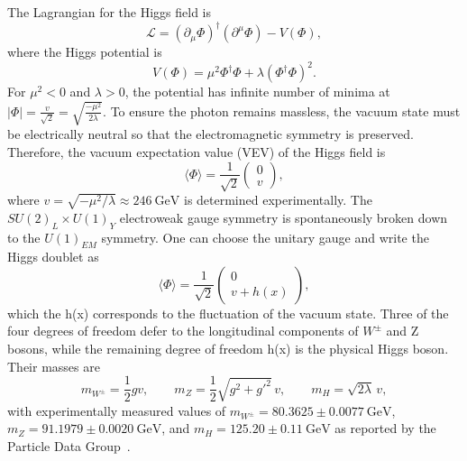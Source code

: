 The Lagrangian for the Higgs field is
\begin{equation}
\mathcal{L} = (\partial_\mu\Phi)^\dagger(\partial^\mu\Phi) - V(\Phi),
\end{equation}
where the Higgs potential is 
\begin{equation}
V(\Phi) = \mu^2 \Phi^\dagger \Phi + \lambda (\Phi^\dagger \Phi)^2.
\end{equation}
For \(\mu^2 < 0\) and \(\lambda > 0\), the potential has infinite number of minima at $|\Phi| = \frac{v}{\sqrt{2}} = \sqrt{\frac{-\mu^2}{2\lambda}}.$ To ensure the photon remains massless, the vacuum state must be electrically neutral so that the electromagnetic symmetry is preserved. Therefore, the vacuum expectation value (VEV) of the Higgs field is
\begin{equation}
\langle \Phi \rangle =
\frac{1}{\sqrt{2}}
\begin{pmatrix}
0 \\
v
\end{pmatrix},
\end{equation}
where \(v = \sqrt{-\mu^2 / \lambda} \approx 246~\text{GeV}\) is determined experimentally. The $SU(2)_L \times U(1)_Y$ electroweak gauge symmetry is spontaneously broken down to the $U(1)_{EM}$ symmetry. One can choose the unitary gauge and write the Higgs doublet as 
\begin{equation}
\langle \Phi \rangle =
\frac{1}{\sqrt{2}}
\begin{pmatrix}
0 \\
v + h(x)
\end{pmatrix},
\end{equation}
which the h(x) corresponds to the fluctuation of the vacuum state. Three of the four degrees of freedom defer to the longitudinal components of $W^\pm$ and Z bosons, while the remaining degree of freedom h(x) is the physical Higgs boson. Their masses are
\begin{equation}
m_{W^\pm} = \frac{1}{2} g v, \qquad
m_Z = \frac{1}{2} \sqrt{g^2 + g'^2}\, v, \qquad 
m_H = \sqrt{2 \lambda}\, v,
\end{equation}
with experimentally measured values of $m_{W^\pm} = 80.3625 \pm 0.0077~\mathrm{GeV}$, $m_Z = 91.1979 \pm 0.0020~\mathrm{GeV}$, and $m_H = 125.20 \pm 0.11~\mathrm{GeV}$ as reported by the Particle Data Group~\cite{PDG2024}. 

